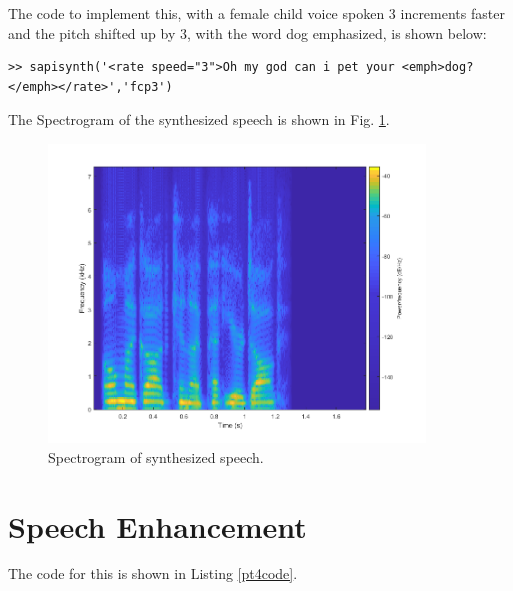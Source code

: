 \documentclass[letterpaper]{article}
\begin{document}
The code to implement this, with a female child voice spoken 3 increments faster and the pitch shifted up by 3, with the word dog emphasized, is shown below:

\begin{lstlisting}[caption = {Sentence of speech that was synthesized.}]
>> sapisynth('<rate speed="3">Oh my god can i pet your <emph>dog?</emph></rate>','fcp3')

\end{lstlisting}

The Spectrogram of the synthesized speech is shown in Fig. \ref{fig:spec}.

\begin{figure}[h!]
    \centering
    \includegraphics[width=10cm]{ee599hw5p3}
    \caption{Spectrogram of synthesized speech.}
    \label{fig:spec}
\end{figure}


\section{Speech Enhancement}

The code for this is shown in Listing \ref{pt4code}.





\end{document}
